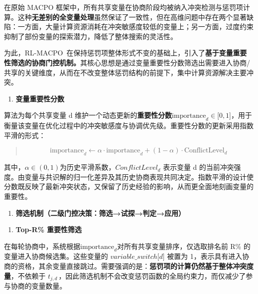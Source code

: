 \documentclass[12pt]{ctexart}
\begin{document}
在原始 MACPO
框架中，所有共享变量在协商阶段均被纳入冲突检测与惩罚项计算。这种\textbf{无差别的全变量处理}虽然保证了一致性，但在高维问题中存在两个显著缺陷：一方面，大量计算资源消耗在冲突敏感度较低的变量上；另一方面，过度约束抑制了部份变量的探索潜力，降低了整体搜索的灵活性。

为此，RL-MACPO~在保持惩罚项整体形式不变的基础上，引入了\textbf{基于变量重要性筛选的协商门控机制。}其核心思想是通过变量重要性分数筛选出需要进入协商/共享的关键维度，从而在不改变整体惩罚结构的前提下，集中计算资源解决主要冲突。

\begin{enumerate}
\def\labelenumi{(\arabic{enumi})}
\item
  \textbf{变量重要性分数}
\end{enumerate}

算法为每个共享变量 d
维护一个动态更新的\textbf{重要性分数}\(\text{importance}_{d} \in \lbrack 0,1\rbrack\)，用于衡量该变量在优化过程中的冲突敏感度与协调优先级。重要性分数的更新采用指数平滑的形式：

\begin{quote}
\[\text{importance}_{d} \leftarrow \alpha \cdot \text{importance}_{d} + (1 - \alpha) \cdot {\text{C}\text{onflictLevel}}_{d}\]
\end{quote}

其中，\(\alpha \in (0,1)\)为历史平滑系数，\(ConflictLevel_{d}\) 表示变量
d
的当前冲突强度。由变量与共识解的归一化差异及其历史协商表现共同决定。指数平滑的设计使分数既反映了最新冲突状态，又保留了历史经验的影响，从而更全面地刻画变量的重要性。

\begin{enumerate}
\def\labelenumi{(\arabic{enumi})}
\setcounter{enumi}{1}
\item
  \textbf{筛选机制（二级门控决策：筛选→试探→判定→应用）}
\end{enumerate}

\begin{enumerate}
\def\labelenumi{\alph{enumi})}
\item
  \textbf{Top-R\% 重要性筛选}
\end{enumerate}

在每轮协商中，系统根据\(\text{importance}_{d}\)对所有共享变量排序，仅选取排名前
R\% 的变量进入协商候选集。这些变量的
\(variable\_ switch\lbrack d\rbrack\) 被置为
1，表示具有进入协商的资格，其余变量直接跳过。需要强调的是：\textbf{惩罚项的计算仍然基于整体冲突度量}，不依赖于
\(t_{j,d\ }\)，因此筛选机制不会改变惩罚函数的全局约束力，而仅减少了参与协商的变量数量。
\end{document}
